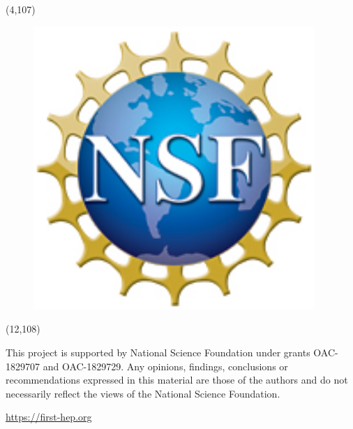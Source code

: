 \documentclass[final]{beamer}
\begin{document}
\begin{frame}{}
\begin{textblock}{8.0}(4,107)
\begin{figure}[tbph]
\centering
\includegraphics[width=0.95\textwidth]{images/nsf1.jpg}
\end{figure}
\end{textblock}

\begin{textblock}{58.0}(12,108)
\begin{center}
This project is supported by National Science Foundation under grants OAC-1829707 and OAC-1829729. Any opinions, findings, conclusions or recommendations expressed in this material are those of the authors and do not necessarily reflect the views of the National Science Foundation.
\end{center}
\begin{center}
\Large
\url{https://first-hep.org}
\end{center}

\end{textblock}


\end{frame}
\end{document}
